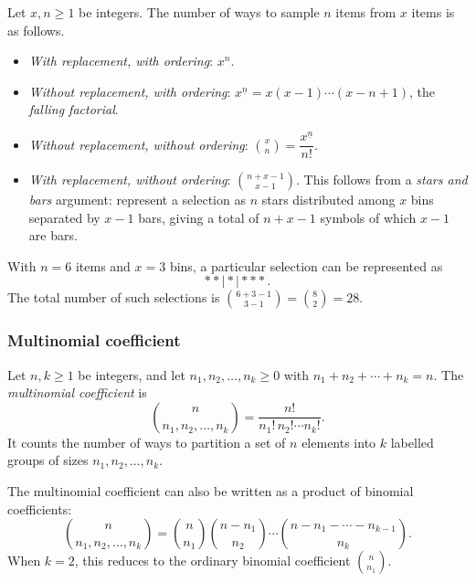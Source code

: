 \documentclass[a4paper]{article}
\begin{document}
\begin{prop}
  Let $x, n \geq 1$ be integers. The number of ways to sample $n$ items from $x$ items is as follows.
  \begin{itemize}
    \item \emph{With replacement, with ordering}: $x^n$.
    \item \emph{Without replacement, with ordering}: $x^{\underline{n}} = x(x - 1)\cdots (x - n + 1)$, the \emph{falling factorial}.
    \item \emph{Without replacement, without ordering}: $\binom{x}{n} = \dfrac{x^{\underline{n}}}{n!}$.
    \item \emph{With replacement, without ordering}: $\binom{n + x - 1}{x - 1}$. This follows from a \emph{stars and bars} argument: represent a selection as $n$ stars distributed among $x$ bins separated by $x - 1$ bars, giving a total of $n + x - 1$ symbols of which $x - 1$ are bars.
  \end{itemize}
\end{prop}

\begin{eg}
  With $n = 6$ items and $x = 3$ bins, a particular selection can be represented as
  \[
    **\mid *\mid ***.
  \]
  The total number of such selections is $\binom{6 + 3 - 1}{3 - 1} = \binom{8}{2} = 28$.
\end{eg}

\subsubsection*{Multinomial coefficient}

\begin{defi}
  Let $n, k \geq 1$ be integers, and let $n_1, n_2, \dotsc, n_k \geq 0$ with $n_1 + n_2 + \cdots + n_k = n$. The \emph{multinomial coefficient} is
  \[
    \binom{n}{n_1, n_2, \dotsc, n_k} = \frac{n!}{n_1!\, n_2!\cdots n_k!}.
  \]
  It counts the number of ways to partition a set of $n$ elements into $k$ labelled groups of sizes $n_1, n_2, \dotsc, n_k$.
\end{defi}

\begin{remark}
  The multinomial coefficient can also be written as a product of binomial coefficients:
  \[
    \binom{n}{n_1, n_2, \dotsc, n_k} = \binom{n}{n_1}\binom{n - n_1}{n_2}\cdots \binom{n - n_1 - \cdots - n_{k-1}}{n_k}.
  \]
  When $k = 2$, this reduces to the ordinary binomial coefficient $\binom{n}{n_1}$.
\end{remark}
\end{document}
